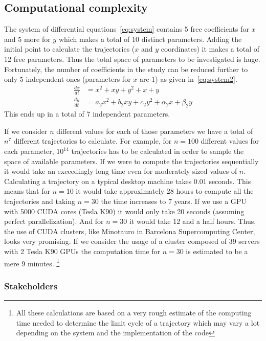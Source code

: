 \pagebreak

\subsection{Computational complexity}

The system of differential equations~\cref{eq:system} contains 5 free coefficients for $x$ and 5 more for $y$ which makes a total of 10 distinct parameters. Adding the initial point to calculate the trajectories ($x$ and $y$ coordinates) it makes a total of 12 free parameters. Thus the total space of parameters to be investigated is huge. Fortunately, the number of coefficients in the study can be reduced further to only 5 independent ones (parameters for $x$ are 1) as given in~\cref{eq:system2}.
\begin{align}\label{eq:system2}
    \frac{dx}{dt} &= x^2 + xy + y^2 + x + y \nonumber \\
    \frac{dy}{dt} &= a_2x^2 + b_2xy + c_2y^2 + \alpha_2x + \beta_2y
\end{align}
This ends up in a total of 7 independent parameters.

If we consider $n$ different values for each of those parameters we have a total of $n^7$ different trajectories to calculate. For example, for $n=100$ different values for each parameter, $10^{14}$ trajectories has to be calculated in order to sample the space of available parameters. If we were to compute the trajectories sequentially it would take an exceedingly long time even for moderately sized values of $n$. Calculating a trajectory on a typical desktop machine takes 0.01 seconds. This means that for $n=10$ it would take approximately 28 hours to compute all the trajectories and taking $n=30$ the time increases to 7 years. If we use a GPU with 5000 CUDA cores (Tesla K90) it would only take 20 seconds (assuming perfect parallelization). And for $n=30$ it would take 12 and a half hours. Thus, the use of CUDA clusters, like Minotauro in Barcelona Supercomputing Center, looks very promising. If we consider the usage of a cluster composed of 39 servers with 2 Tesla K90 GPUs the computation time for $n=30$ is estimated to be a mere 9 minutes. \footnote{All these calculations are based on a very rough estimate of the computing time needed to determine the limit cycle of a trajectory which may vary a lot depending on the system and the implementation of the code}

\subsubsection{Stakeholders}

